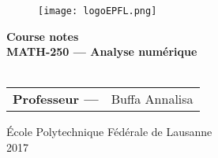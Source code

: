
\begin{titlepage}
\begin{center}



\vfill


\begin{figure}[!ht]
\centering
\texttt{[image: logoEPFL.png]}
\end{figure}







{ \bfseries Course notes }
\hrulefill\\[0.5cm]
\large{\textbf{MATH-250 --- Analyse numérique}} \\
\hrulefill\\[0.5cm]


\vfill
\vfill
\parbox[H][][c]{\textwidth}
	{
	\begin{tabular}{rl}
	\textbf{Professeur ---} &  Buffa Annalisa \\	 		
	\end{tabular}
	}\par
	






\'Ecole Polytechnique F\'ed\'erale de Lausanne
$\,$\\
2017\\
$\,$\\
\end{center}

\end{titlepage}


